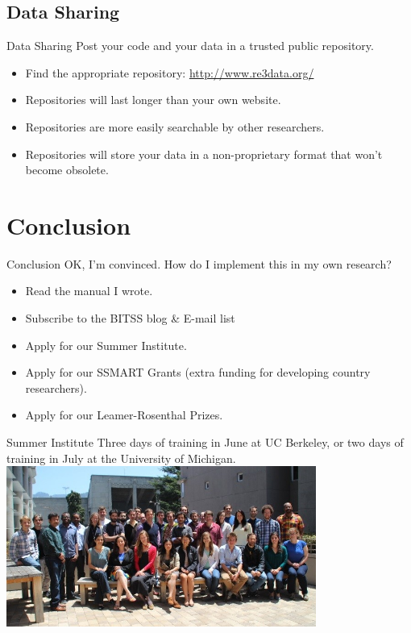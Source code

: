 \documentclass{beamer}
\begin{document}
\subsection*{Data Sharing}
\begin{frame}{Data Sharing}
Post your code and your data in a trusted public repository.
\begin{itemize}[<.->]
\item
Find the appropriate repository: \url{http://www.re3data.org/}
\item
Repositories will last longer than your own website.
\item
Repositories are more easily searchable by other researchers.
\item
Repositories will store your data in a non-proprietary format that won't become obsolete.
\end{itemize}
\end{frame}

\section{Conclusion}
\begin{frame}{Conclusion}
OK, I'm convinced. How do I implement this in my own research?

\begin{itemize}
\item Read the manual I wrote.\href{https://github.com/garretchristensen/BestPracticesManual}{}
\item Subscribe to the BITSS blog \& E-mail list \href{https://bitss.org/blog}{}
\item Apply for our Summer Institute. \href{http://www.bitss.org/events/summer-institute/}{}
\item Apply for our SSMART Grants (extra funding for developing country researchers). \href{http://www.bitss.org/ssmart-grants/}{}

\item Apply for our Leamer-Rosenthal Prizes. \href{http://www.bitss.org/lr-prizes/}{}
\end{itemize}
\end{frame}

\begin{frame}{Summer Institute}
Three days of training in June at UC Berkeley, or two days of training in July at the University of Michigan.
\includegraphics[width=4in]{../Images/bitss-2014-cohort2.jpg}
\end{frame}
\end{document}
